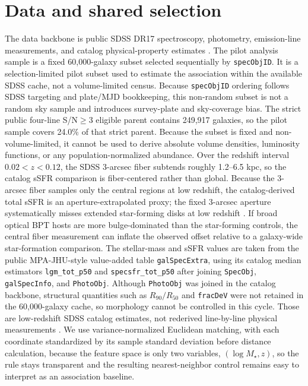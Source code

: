 \documentclass[twocolumn]{aastex631}
\begin{document}
\section{Data and shared selection}
The data backbone is public SDSS DR17 spectroscopy, photometry, emission-line measurements, and catalog physical-property estimates \citep{york2000,sdssdr17,brinchmann2004}. The pilot analysis sample is a fixed 60,000-galaxy subset selected sequentially by \texttt{specObjID}. It is a selection-limited pilot subset used to estimate the association within the available SDSS cache, not a volume-limited census. Because \texttt{specObjID} ordering follows SDSS targeting and plate/MJD bookkeeping, this non-random subset is not a random sky sample and introduces survey-plate and sky-coverage bias. The strict public four-line S/N$\geq3$ eligible parent contains 249,917 galaxies, so the pilot sample covers 24.0\% of that strict parent. Because the subset is fixed and non-volume-limited, it cannot be used to derive absolute volume densities, luminosity functions, or any population-normalized abundance.
Over the redshift interval $0.02<z<0.12$, the SDSS 3-arcsec fiber subtends roughly 1.2--6.5 kpc, so the catalog sSFR comparison is fiber-centered rather than global.
Because the 3-arcsec fiber samples only the central regions at low redshift, the catalog-derived total sSFR is an aperture-extrapolated proxy; the fixed 3-arcsec aperture systematically misses extended star-forming disks at low redshift \citep{kewley2005}. If broad optical BPT hosts are more bulge-dominated than the star-forming controls, the central fiber measurement can inflate the observed offset relative to a galaxy-wide star-formation comparison.
The stellar-mass and sSFR values are taken from the public MPA-JHU-style value-added table \texttt{galSpecExtra}, using its catalog median estimators \texttt{lgm\_tot\_p50} and \texttt{specsfr\_tot\_p50} after joining \texttt{SpecObj}, \texttt{galSpecInfo}, and \texttt{PhotoObj}. Although \texttt{PhotoObj} was joined in the catalog backbone, structural quantities such as \(R_{90}/R_{50}\) and \texttt{fracDeV} were not retained in the 60,000-galaxy cache, so morphology cannot be controlled in this cycle. Those are low-redshift SDSS catalog estimates, not rederived line-by-line physical measurements \citep{brinchmann2004,sdssdr17,york2000}. We use variance-normalized Euclidean matching, with each coordinate standardized by its sample standard deviation before distance calculation, because the feature space is only two variables, $(\log M_\star,z)$, so the rule stays transparent and the resulting nearest-neighbor control remains easy to interpret as an association baseline.
\end{document}
